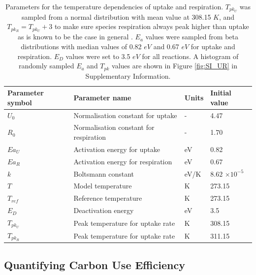 \documentclass[11pt, a4paper]{article}
\begin{document}
\begin{spacing}{1.5}
\begin{table}
    \caption{Parameters for the temperature dependencies of uptake and respiration. $T_{pk_U}$ was sampled from a normal distribution with mean value at 308.15 $K$, and $T_{pk_R} = T_{pk_U} + 3$ to make sure species respiration always peak higher than uptake as is known to be the case in general \citep{smith2020systematic}. $E_a$ values were sampled from beta distributions with median values of 0.82 $eV$ and 0.67 $eV$ for uptake and respiration. $E_D$ values were set to 3.5 $eV$ for all reactions. A histogram of randomly sampled $E_a$ and $T_{pk}$ values are shown in Figure \ref{fig:SI_UR} in Supplementary Information. }
    \centering
    \begin{tabular}{ |m{3.3cm}<{\centering}|m{7cm}<{\centering}|m{1.5cm}<{\centering}|m{2.7cm}<{\centering}| } 
    \hline
     Parameter symbol & Parameter name & Units & Initial value \\
     \hline
    $U_0$ & Normalisation constant for uptake & - & 4.47 \\
    $R_0$ & Normalisation constant for respiration & - & 1.70 \\
    $Ea_U$ & Activation energy for uptake & eV & 0.82 \\
    $Ea_R$ & Activation energy for respiration & eV & 0.67 \\
    $k$ & Boltsmann constant & eV/K & $8.62$ $\times 10^{-5}$ \\
    $T$ & Model temperature & K & 273.15 \\
    $T_{ref}$ & Reference temperature & K & 273.15 \\
    $E_D$ & Deactivation energy & eV & 3.5 \\
    $T_{pk_U}$ & Peak temperature for uptake rate & K & 308.15 \\
    $T_{pk_R}$ & Peak temperature for uptake rate & K & 311.15 \\
    \hline
    \end{tabular}    
    \label{tab:T}
\end{table}

\subsection{Quantifying Carbon Use Efficiency }\label{section:CUE}


\end{spacing}
\end{document}
